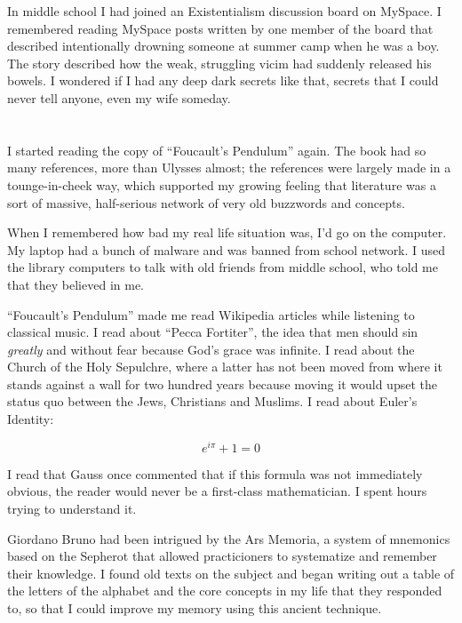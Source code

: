 In middle school I had joined an Existentialism discussion board on MySpace.  I
remembered reading MySpace posts written by one member of the board that
described intentionally drowning someone at summer camp when he was a boy.  The
story described how the weak, struggling vicim had suddenly released his bowels.
I wondered if I had any deep dark secrets like that, secrets that I could never
tell anyone, even my wife someday.

\section{}

I started reading the copy of ``Foucault's Pendulum'' again.  The book had so
many references, more than Ulysses almost; the references were largely made in a
tounge-in-cheek way, which supported my growing feeling that literature was a
sort of massive, half-serious network of very old buzzwords and concepts.

When I remembered how bad my real life situation was, I'd go on the computer.
My laptop had a bunch of malware and was banned from school network.  I used the
library computers to talk with old friends from middle school, who told me that
they believed in me.  

``Foucault's Pendulum'' made me read  Wikipedia articles while listening to
classical music.  I read about ``Pecca Fortiter'', the idea that men should sin
\textit{greatly} and without fear because God's grace was infinite.  I read
about the Church of the Holy Sepulchre, where a latter has not been moved from
where it stands against a wall for two hundred years because moving it would
upset the status quo between the Jews, Christians and Muslims.  I read about
Euler's Identity:

\begin{equation}
  e^{i\pi} + 1 = 0
\end{equation}
      
I read that Gauss once commented that if this formula was not immediately
obvious, the reader would never be a first-class mathematician.  I spent
hours trying to understand it. 

Giordano Bruno had been intrigued by the Ars Memoria, a system of mnemonics
based on the Sepherot that allowed practicioners to systematize and remember
their knowledge.  I found old texts on the subject and began writing out a table
of the letters of the alphabet and the core concepts in my life that they
responded to, so that I could improve my memory using this ancient technique.


